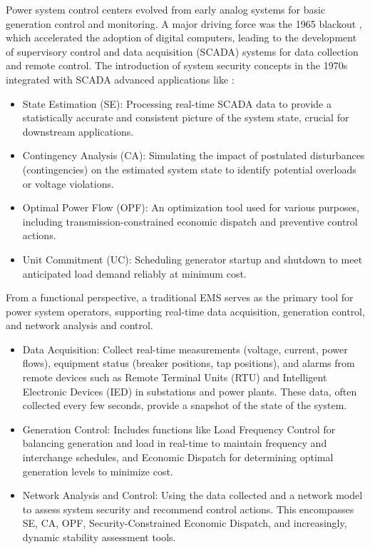 Power system control centers evolved from early analog systems for basic generation control and monitoring. A major driving force was the 1965 blackout \autocite{USFedEnergyComm1967}, which accelerated the adoption of digital computers, leading to the development of supervisory control and data acquisition (SCADA) systems for data collection and remote control. The introduction of system security concepts in the 1970s integrated with SCADA advanced applications like \autocite{Handschin_Petroianu_1991}: 
\begin{itemize}
    \item State Estimation (SE): Processing real-time SCADA data to provide a statistically accurate and consistent picture of the system state, crucial for downstream applications.
    \item Contingency Analysis (CA): Simulating the impact of postulated disturbances (contingencies) on the estimated system state to identify potential overloads or voltage violations.
    \item Optimal Power Flow (OPF): An optimization tool used for various purposes, including transmission-constrained economic dispatch and preventive control actions.
    \item Unit Commitment (UC): Scheduling generator startup and shutdown to meet anticipated load demand reliably at minimum cost.
\end{itemize}


From a functional perspective, a traditional EMS serves as the primary tool for power system operators, supporting real-time data acquisition, generation control, and network analysis and control.

\begin{itemize}
    \item Data Acquisition: Collect real-time measurements (voltage, current, power flows), equipment status (breaker positions, tap positions), and alarms from remote devices such as Remote Terminal Units (RTU) and Intelligent Electronic Devices (IED) in substations and power plants. These data, often collected every few seconds, provide a snapshot of the state of the system.
    \item Generation Control: Includes functions like Load Frequency Control for balancing generation and load in real-time to maintain frequency and interchange schedules, and Economic Dispatch for determining optimal generation levels to minimize cost.
    \item Network Analysis and Control: Using the data collected and a network model to assess system security and recommend control actions. This encompasses SE, CA, OPF, Security-Constrained Economic Dispatch, and increasingly, dynamic stability assessment tools.
\end{itemize}

